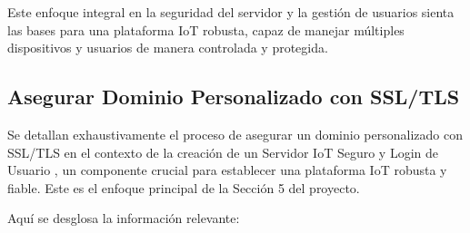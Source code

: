 \documentclass{report}
\begin{document}
Este enfoque integral en la seguridad del servidor y la gestión de usuarios sienta las bases para una plataforma IoT robusta, capaz de manejar 
múltiples dispositivos y usuarios de manera controlada y protegida.

\subsection{Asegurar Dominio Personalizado con SSL/TLS}
Se detallan exhaustivamente el proceso de  asegurar un dominio personalizado con SSL/TLS  en el contexto de la creación de un  Servidor IoT 
Seguro y Login de Usuario , un componente crucial para establecer una plataforma IoT robusta y fiable. Este es el enfoque principal de la Sección 5 
del proyecto.

Aquí se desglosa la información relevante:
\end{document}
